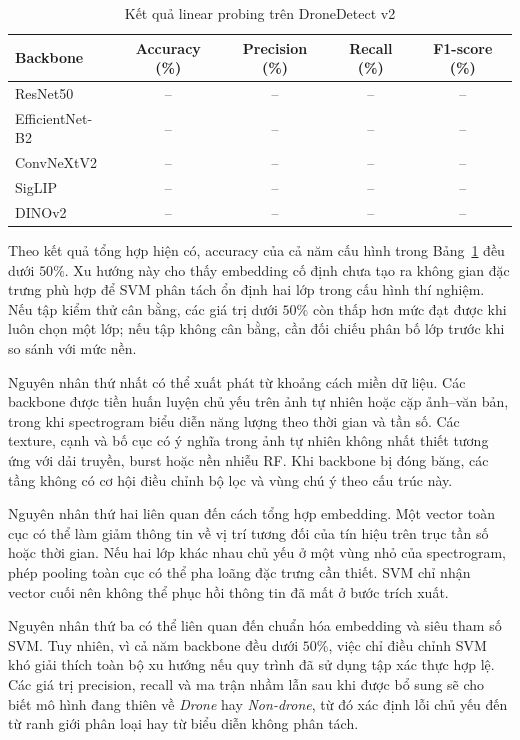\documentclass[../DoAn.tex]{subfiles}
\begin{document}
\begin{table}[H]
    \centering
    \caption{Kết quả linear probing trên DroneDetect v2}
    \label{tab:linear_probe_benchmark}
    \renewcommand{\arraystretch}{1.3}
    \begin{tabular}{|p{}|c|c|c|c|}
        \hline
        \textbf{Backbone} & \textbf{Accuracy (\%)} & \textbf{Precision (\%)} & \textbf{Recall (\%)} & \textbf{F1-score (\%)} \\ \hline
        ResNet50 & -- & -- & -- & -- \\ \hline
        EfficientNet-B2 & -- & -- & -- & -- \\ \hline
        ConvNeXtV2 & -- & -- & -- & -- \\ \hline
        SigLIP & -- & -- & -- & -- \\ \hline
        DINOv2 & -- & -- & -- & -- \\ \hline
    \end{tabular}
\end{table}

Theo kết quả tổng hợp hiện có, accuracy của cả năm cấu hình trong Bảng~\ref{tab:linear_probe_benchmark} đều dưới $50\%$. Xu hướng này cho thấy embedding cố định chưa tạo ra không gian đặc trưng phù hợp để SVM phân tách ổn định hai lớp trong cấu hình thí nghiệm. Nếu tập kiểm thử cân bằng, các giá trị dưới $50\%$ còn thấp hơn mức đạt được khi luôn chọn một lớp; nếu tập không cân bằng, cần đối chiếu phân bố lớp trước khi so sánh với mức nền.

Nguyên nhân thứ nhất có thể xuất phát từ khoảng cách miền dữ liệu. Các backbone được tiền huấn luyện chủ yếu trên ảnh tự nhiên hoặc cặp ảnh--văn bản, trong khi spectrogram biểu diễn năng lượng theo thời gian và tần số. Các texture, cạnh và bố cục có ý nghĩa trong ảnh tự nhiên không nhất thiết tương ứng với dải truyền, burst hoặc nền nhiễu RF. Khi backbone bị đóng băng, các tầng không có cơ hội điều chỉnh bộ lọc và vùng chú ý theo cấu trúc này.

Nguyên nhân thứ hai liên quan đến cách tổng hợp embedding. Một vector toàn cục có thể làm giảm thông tin về vị trí tương đối của tín hiệu trên trục tần số hoặc thời gian. Nếu hai lớp khác nhau chủ yếu ở một vùng nhỏ của spectrogram, phép pooling toàn cục có thể pha loãng đặc trưng cần thiết. SVM chỉ nhận vector cuối nên không thể phục hồi thông tin đã mất ở bước trích xuất.

Nguyên nhân thứ ba có thể liên quan đến chuẩn hóa embedding và siêu tham số SVM. Tuy nhiên, vì cả năm backbone đều dưới $50\%$, việc chỉ điều chỉnh SVM khó giải thích toàn bộ xu hướng nếu quy trình đã sử dụng tập xác thực hợp lệ. Các giá trị precision, recall và ma trận nhầm lẫn sau khi được bổ sung sẽ cho biết mô hình đang thiên về \textit{Drone} hay \textit{Non-drone}, từ đó xác định lỗi chủ yếu đến từ ranh giới phân loại hay từ biểu diễn không phân tách.
\end{document}
